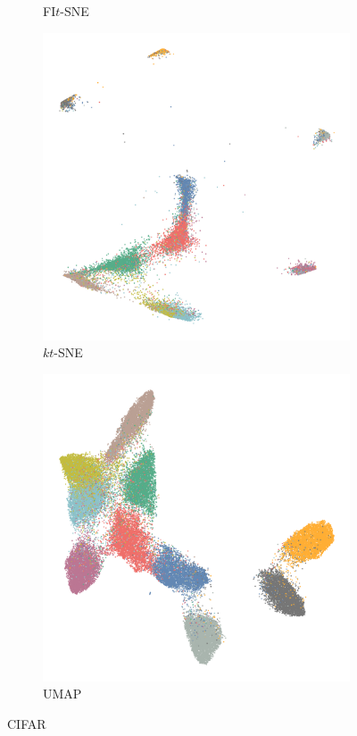 \begin{appendix}
\begin{figure}[tbp]
\begin{subfigure}{0.45\linewidth}
    \caption{FI$t$-SNE}
\end{subfigure}
\par\bigskip
\begin{subfigure}{0.45\linewidth}
  \centering
    \includegraphics[width=\linewidth]{img/emb/ktsne_cifar}
    \caption{$kt$-SNE}
\end{subfigure}
  \begin{subfigure}{0.45\linewidth}
    \centering
    \includegraphics[width=\linewidth]{img/emb/umap_cifar}
    \caption{UMAP}
  \end{subfigure}
  \caption{CIFAR}
\end{figure}


\end{appendix}
